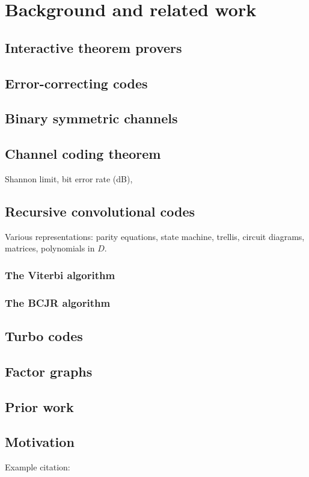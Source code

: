 \chapter{Background and related work}
\label{cha:background}

\section{Interactive theorem provers}

\section{Error-correcting codes}

\section{Binary symmetric channels}

\section{Channel coding theorem}

Shannon limit, bit error rate (dB), 

\section{Recursive convolutional codes}

Various representations: parity equations, state machine, trellis, circuit diagrams, matrices, polynomials in $D$.

\subsection {The Viterbi algorithm}

\subsection{The BCJR algorithm}

\section{Turbo codes}

\section{Factor graphs}

\section{Prior work}

\section{Motivation}

Example citation: \citep{LH:83,Moon:84,Ungar:84}




